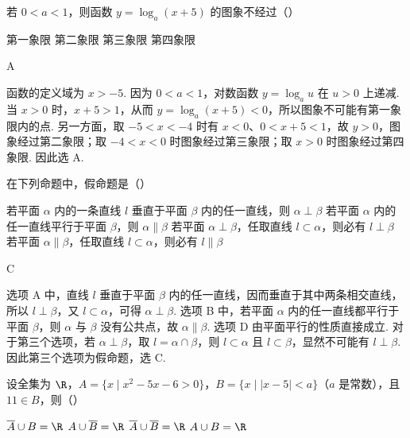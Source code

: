 \documentclass[UTF8,a4paper,oneside,11pt]{ctexbook}
\begin{document}
\begin{problem}
若 \(0 < a < 1 \)，则函数 \(y = \log_{a}(x + 5) \) 的图象不经过（\quad）

\choices
    {第一象限}
    {第二象限}
    {第三象限}
    {第四象限}
\end{problem}

\begin{answer}
A
\end{answer}

\begin{solution}
函数的定义域为 \(x>-5\). 因为 \(0<a<1\)，对数函数 \(y=\log_a u\) 在 \(u>0\) 上递减. 当 \(x>0\) 时，\(x+5>1\)，从而 \(y=\log_a(x+5)<0\)，所以图象不可能有第一象限内的点. 另一方面，取 \(-5<x<-4\) 时有 \(x<0\)、\(0<x+5<1\)，故 \(y>0\)，图象经过第二象限；取 \(-4<x<0\) 时图象经过第三象限；取 \(x>0\) 时图象经过第四象限. 因此选 A.
\end{solution}

\begin{problem}
在下列命题中，假命题是（\quad）

\choices
    {若平面 \(\alpha \) 内的一条直线 \(l\) 垂直于平面 \(\beta \) 内的任一直线，则 \(\alpha \perp \beta \)}
    {若平面 \(\alpha \) 内的任一直线平行于平面 \(\beta \)，则 \(\alpha \parallel \beta \)}
    {若平面 \(\alpha \perp \beta \)，任取直线 \(l \subset \alpha \)，则必有 \(l \perp \beta \)}
    {若平面 \(\alpha \parallel \beta\)，任取直线 \(l \subset \alpha\)，则必有 \(l \parallel \beta\)}
\end{problem}

\begin{answer}
C
\end{answer}

\begin{solution}
选项 A 中，直线 \(l\) 垂直于平面 \(\beta\) 内的任一直线，因而垂直于其中两条相交直线，所以 \(l\perp\beta\)，又 \(l\subset\alpha\)，可得 \(\alpha\perp\beta\). 选项 B 中，若平面 \(\alpha\) 内的任一直线都平行于平面 \(\beta\)，则 \(\alpha\) 与 \(\beta\) 没有公共点，故 \(\alpha\parallel\beta\). 选项 D 由平面平行的性质直接成立. 对于第三个选项，若 \(\alpha\perp\beta\)，取 \(l=\alpha\cap\beta\)，则 \(l\subset\alpha\) 且 \(l\subset\beta\)，显然不可能有 \(l\perp\beta\). 因此第三个选项为假命题，选 C.
\end{solution}

\begin{problem}
设全集为 \(\R\)，\(A = \{x \mid x^2 - 5x - 6 > 0\}\)，\(B = \{x \mid |x - 5| < a\}\)（\(a\) 是常数），且 \(11 \in B\)，则（\quad）

\choices
    {\(\overline{A} \cup B = \R\)}
    {\(A \cup \overline{B} = \R\)}
    {\(\overline{A}\cup\overline{B} = \R\)}
    {\(A \cup B = \R\)}
\end{problem}
\end{document}
